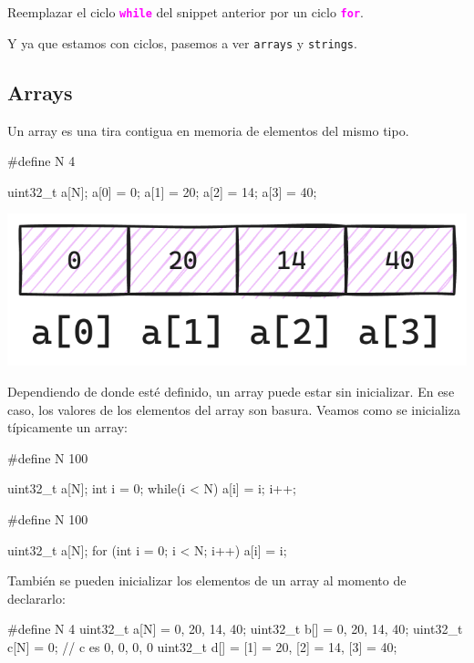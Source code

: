 \documentclass[]{scrartcl}
\newcommand{\hl}[1]{\textcolor{magenta}{\textbf{\texttt{#1}}}}
\begin{document}
\begin{exbox}[]
  Reemplazar el ciclo \hl{while} del snippet anterior por un ciclo \hl{for}.
\end{exbox}
 
Y ya que estamos con ciclos, pasemos a ver \texttt{arrays} y \texttt{strings}.

\subsection*{Arrays}
Un array es una tira contigua en memoria de elementos del mismo tipo.

\begin{cbox}[]{}
#define N 4

uint32_t a[N];
a[0] = 0;
a[1] = 20;
a[2] = 14;
a[3] = 40;

\end{cbox}

\begin{center}
  \includegraphics[scale=0.25]{./img/array.png}
  \label{fig:array}
\end{center}

Dependiendo de donde esté definido, un array puede estar sin inicializar. En ese caso, los valores de los elementos del array son basura. Veamos como se inicializa típicamente un array:

\begin{cbox}[]{}
  #define N 100

  uint32_t a[N];
  int i = 0;
  while(i < N){
    a[i] = i;
    i++;
  }
\end{cbox}

\begin{cbox}[]{}
  #define N 100

  uint32_t a[N];
  for (int i = 0; i < N; i++){
    a[i] = i;
  }
\end{cbox}

También se pueden inicializar los elementos de un array al momento de declararlo:

\begin{cbox}[]{}
#define N 4
uint32_t a[N] = {0, 20, 14, 40};
uint32_t b[] = {0, 20, 14, 40};
uint32_t c[N] = {0}; // c es {0, 0, 0, 0}
uint32_t d[] = {[1] = 20, [2] = 14, [3] = 40};
\end{cbox}
\end{document}
